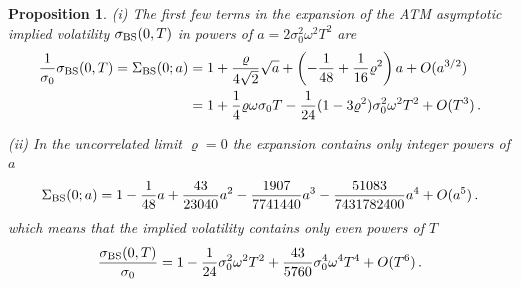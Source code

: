 \documentclass[11pt]{article}
\numberwithin{equation}{section}
\theoremstyle{plain}
\newtheorem{proposition}[theorem]{Proposition}
\begin{document}
\begin{proposition}\label{prop:JX0}
(i) The first few terms in the expansion of the ATM asymptotic implied volatility 
$\sigma_{\rm BS}(0,T)$ in powers of $a =2\sigma_0^2\omega^2 T^2$ are
\begin{align}\label{SigATMT2}
\frac{1}{\sigma_0}\sigma_{\rm BS}(0,T) = \Sigma_{\rm BS}(0;a) 
&= 1 + \frac{\varrho}{4\sqrt2} \sqrt{a} +
\left( - \frac{1}{48} + \frac{1}{16} \varrho^2 \right) a + O(a^{3/2})\\
&= 1 +\frac14\varrho \omega\sigma_0 T
- \frac{1}{24} (1-3\varrho^2) \sigma_0^2\omega^2 T^2
+ O(T^3)\,.\nonumber
\end{align}

(ii) In the uncorrelated limit $\varrho=0$ the expansion contains only integer
powers of $a$
\begin{equation}
\Sigma_{\rm BS}(0;a) = 1 - \frac{1}{48} a + \frac{43}{23040} a^2 -
\frac{1907}{7741440} a^3 - \frac{51083}{7431782400} a^4 + O(a^5)\,.
\end{equation}
which means that the implied volatility contains only even powers of $T$
\begin{equation}\label{JX0aTaylor2}
\frac{\sigma_{\rm BS}(0,T)}{\sigma_0} = 1 - \frac{1}{24} \sigma_0^2\omega^2 T^2
+ \frac{43}{5760} \sigma_0^4\omega^4 T^4 + O(T^6)\,.
\end{equation}
\end{proposition}
\end{document}
